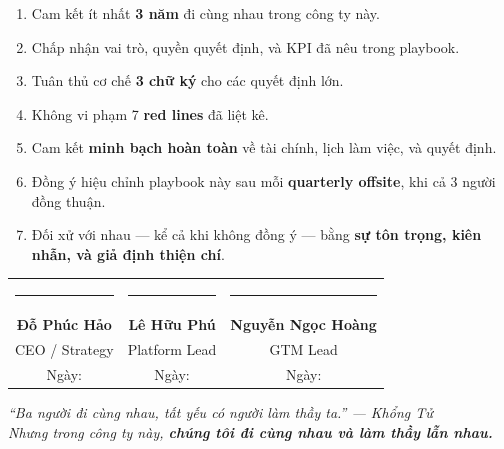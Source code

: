 \documentclass[11pt,a4paper]{article}
\begin{document}
\begin{enumerate}
\item Cam kết ít nhất \textbf{3 năm} đi cùng nhau trong công ty này.
\item Chấp nhận vai trò, quyền quyết định, và KPI đã nêu trong playbook.
\item Tuân thủ cơ chế \textbf{3 chữ ký} cho các quyết định lớn.
\item Không vi phạm 7 \textbf{red lines} đã liệt kê.
\item Cam kết \textbf{minh bạch hoàn toàn} về tài chính, lịch làm việc, và quyết định.
\item Đồng ý hiệu chỉnh playbook này sau mỗi \textbf{quarterly offsite}, khi cả 3 người đồng thuận.
\item Đối xử với nhau --- kể cả khi không đồng ý --- bằng \textbf{sự tôn trọng, kiên nhẫn, và giả định thiện chí}.
\end{enumerate}

\vspace{2em}

\begin{center}
\begin{tabular}{ccc}
\rule{5cm}{0.4pt} & \rule{5cm}{0.4pt} & \rule{5cm}{0.4pt} \\
\textbf{Đỗ Phúc Hảo} & \textbf{Lê Hữu Phú} & \textbf{Nguyễn Ngọc Hoàng} \\
CEO / Strategy & Platform Lead & GTM Lead \\
\small Ngày: \hspace{2cm} & \small Ngày: \hspace{2cm} & \small Ngày: \hspace{2cm} \\
\end{tabular}
\end{center}

\vfill

\begin{center}
\small\itshape\color{mid}
``Ba người đi cùng nhau, tất yếu có người làm thầy ta.'' --- \textit{Khổng Tử}\\[0.5em]
Nhưng trong công ty này, \textbf{chúng tôi đi cùng nhau và làm thầy lẫn nhau.}
\end{center}
\end{document}

